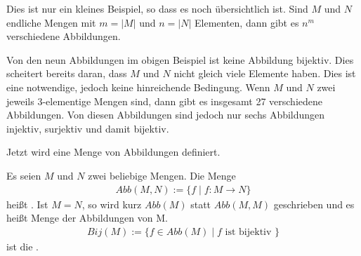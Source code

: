 \begin{Unit}[Anmerkung] 
Dies ist nur ein kleines Beispiel, so dass es noch übersichtlich ist. Sind $M$ 
und $N$ endliche Mengen mit $m = |M|$ und $n = |N|$ Elementen, dann gibt es 
$n^m$ verschiedene Abbildungen.

Von den neun Abbildungen im obigen Beispiel ist keine Abbildung bijektiv. Dies 
scheitert bereits daran, dass $M$ und $N$ nicht gleich viele Elemente haben. 
Dies ist eine notwendige, jedoch keine hinreichende Bedingung. Wenn $M$ und 
$N$ zwei jeweils 3-elementige Mengen sind, dann gibt es insgesamt 27 
verschiedene Abbildungen. Von diesen Abbildungen sind jedoch nur sechs 
Abbildungen injektiv, surjektiv und damit bijektiv.
\end{Unit} 

\begin{Unit}
Jetzt wird eine Menge von Abbildungen definiert.

\begin{Definition}
  Es seien $M$ und $N$ zwei beliebige Mengen. Die Menge
  \begin{align}
    Abb(M,N) := \{f \mid f:M \rightarrow N\} 
  \end{align}
  heißt . Ist $M = N$, so 
  wird kurz $Abb(M)$ statt $Abb(M,M)$ geschrieben und es heißt \Begriff
  {Menge der Abbildungen von M}.
  \begin{align}
    Bij(M) := \{f \in Abb(M) \mid f \text{ ist bijektiv } \} 
  \end{align}
  ist die .
\end{Definition} 
\end{Unit} 
